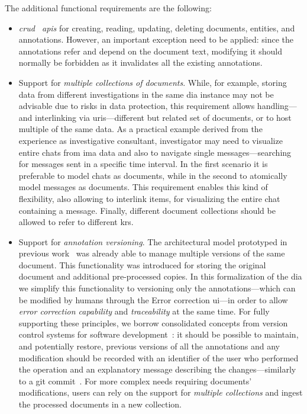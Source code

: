 \noindent
The additional functional requirements are the following:
\begin{itemize}
  \renewcommand\labelitemi{$\diamond$}
    \item \emph{\acf{crud}~\cite{martin1983managing} \acp{api}} for creating, reading, updating, deleting documents, entities, and annotations. However, an important exception need to be applied: since the annotations refer and depend on the document text, modifying it should normally be forbidden as it invalidates all the existing annotations.
    \item Support for \emph{multiple collections of documents}. While, for example, storing data from different investigations in the same \ac{dia} instance may not be advisable due to risks in data protection, this requirement allows handling---and interlinking via \acp{uri}---different but related set of documents, or to host multiple  of the same data. As a practical example derived from the experience as investigative consultant, investigator may need to visualize entire chats from \acf{ima} data and also to navigate single messages---\eg searching for messages sent in a specific time interval. In the first scenario it is preferable to model chats as documents, while in the second to atomically model messages as documents. This requirement enables this kind of flexibility, also allowing to interlink items, \eg for visualizing the entire chat containing a message. Finally, different document collections should be allowed to refer to different \aclp{kr}.
    \item Support for \emph{annotation versioning}. The architectural model prototyped in previous work~\cite{BELLANDI2024} was already able to manage multiple versions of the same document. This functionality was introduced for storing the original document and additional pre-processed copies. In this formalization of the \ac{dia} we simplify this functionality to versioning only the annotations---which can be modified by humans through the Error correction \ac{ui}---in order to allow \emph{error correction capability} and \emph{traceability} at the same time. For fully supporting these principles, we borrow consolidated concepts from version control systems for software development~\cite{version_control_survey_2018}: it should be possible to maintain, and potentially restore, previous versions of all the annotations and any modification should be recorded with an identifier of the user who performed the operation and an explanatory message describing the changes---similarly to a git commit~\cite{version_control_survey_2018}. For more complex needs requiring documents' modifications, users can rely on the support for \emph{multiple collections} and ingest the processed documents in a new collection.

\end{itemize}
